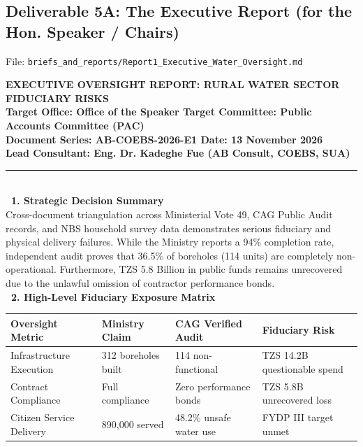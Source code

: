 \documentclass[11pt, a4paper]{report}
\begin{document}
\subsection{Deliverable 5A: The Executive Report (for the Hon. Speaker / Chairs)}
File: \texttt{briefs\_and\_reports/Report1\_Executive\_Water\_Oversight.md}

\begin{tcolorbox}[colback=lightgrey, colframe=bordergrey, title=\textbf{Deliverable 5A Preview: \texttt{Report1\_Executive\_Water\_Oversight.md}}]
\small
\textcolor{tanzaniablue}{\textbf{EXECUTIVE OVERSIGHT REPORT: RURAL WATER SECTOR FIDUCIARY RISKS}}\\
\textbf{\textcolor{tanzaniablue}{Target Office:} Office of the Speaker \quad \textbar{} \quad \textcolor{suagreen}{\textbf{Target Committee:}} Public Accounts Committee (PAC)}\\
\textbf{\textcolor{tanzaniablue}{Document Series:} AB-COEBS-2026-E1 \quad \textbar{} \quad \textcolor{tanzaniablue}{\textbf{Date:}} 13 November 2026}\\
\textbf{\textcolor{tanzaniablue}{Lead Consultant:} Eng. Dr. Kadeghe Fue (AB Consult, COEBS, SUA)}\\[0.2cm]
\rule{\textwidth}{0.4pt}\\[0.2cm]
\textcolor{tanzaniablue}{\textbf{\ 1. Strategic Decision Summary}}\\
Cross-document triangulation across Ministerial Vote 49, CAG Public Audit records, and NBS household survey data demonstrates serious fiduciary and physical delivery failures. While the Ministry reports a 94\% completion rate, independent audit proves that 36.5\% of boreholes (114 units) are completely non-operational. Furthermore, TZS 5.8 Billion in public funds remains unrecovered due to the unlawful omission of contractor performance bonds.\\[0.2cm]
\textcolor{tanzaniablue}{\textbf{\ 2. High-Level Fiduciary Exposure Matrix}}\\
\begin{tabular}{p{3.2cm}p{2.8cm}p{3.2cm}p{3.6cm}}
\toprule
\textbf{Oversight Metric} & \textbf{Ministry Claim} & \textbf{CAG Verified Audit} & \textbf{Fiduciary Risk} \\
\midrule
Infrastructure Execution & 312 boreholes built & 114 non-functional & TZS 14.2B questionable spend \\
Contract Compliance & Full compliance & Zero performance bonds & TZS 5.8B unrecovered loss \\
Citizen Service Delivery & 890,000 served & 48.2\% unsafe water use & FYDP III target unmet \\

\end{tabular}
\end{tcolorbox}
\end{document}
